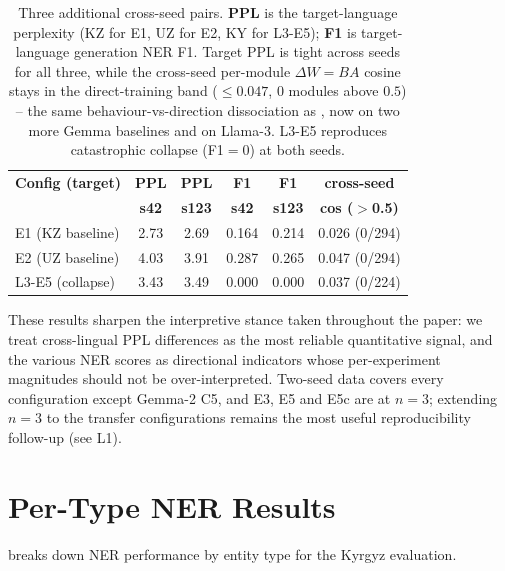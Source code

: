 \documentclass[11pt]{article}
\begin{document}
\begin{table}[!htbp]
\centering
\small
\setlength{\tabcolsep}{3pt}
\begin{tabular}{lccccc}
\toprule
\textbf{Config (target)} & \textbf{PPL} & \textbf{PPL} & \textbf{F1} & \textbf{F1} & \textbf{cross-seed} \\
 & \textbf{s42} & \textbf{s123} & \textbf{s42} & \textbf{s123} & \textbf{cos ($>$0.5)} \\
\midrule
E1 (KZ baseline)  & 2.73 & 2.69 & 0.164 & 0.214 & 0.026 (0/294) \\
E2 (UZ baseline)  & 4.03 & 3.91 & 0.287 & 0.265 & 0.047 (0/294) \\
L3-E5 (collapse)  & 3.43 & 3.49 & 0.000 & 0.000 & 0.037 (0/224) \\
\bottomrule
\end{tabular}
\caption{Three additional cross-seed pairs. \textbf{PPL} is the target-language perplexity (KZ for E1, UZ for E2, KY for L3-E5); \textbf{F1} is target-language generation NER F1. Target PPL is tight across seeds for all three, while the cross-seed per-module $\Delta W{=}BA$ cosine stays in the direct-training band ($\leq 0.047$, $0$ modules above $0.5$) -- the same behaviour-vs-direction dissociation as , now on two more Gemma baselines and on Llama-3. L3-E5 reproduces catastrophic collapse (F1$=0$) at both seeds.}
\label{tab:seed_variance_extra}
\end{table}

These results sharpen the interpretive stance taken throughout the paper: we treat cross-lingual PPL differences as the most reliable quantitative signal, and the various NER scores as directional indicators whose per-experiment magnitudes should not be over-interpreted. Two-seed data covers every configuration except Gemma-2 C5, and E3, E5 and E5c are at $n{=}3$; extending $n{=}3$ to the transfer configurations remains the most useful reproducibility follow-up (see L1).

\section{Per-Type NER Results}
\label{app:ner}

 breaks down NER performance by entity type for the Kyrgyz evaluation.
\end{document}
